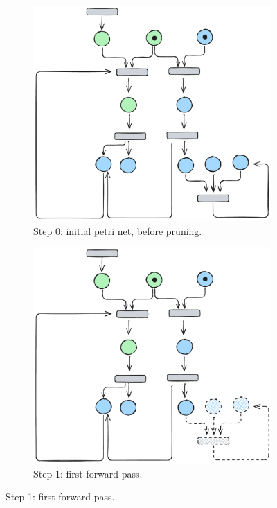 \begin{figure}[!htbp]
	\centering
	
	\begin{subfigure}[b]{0.45\textwidth}
		\centering
		\includegraphics[width=\textwidth]{plots/bidirectional_pruning_step_a_updated.pdf}
		\caption{Step 0: initial petri net, before pruning.}
		\label{fig:step:a}
	\end{subfigure}\hfill
	\begin{subfigure}[b]{0.45\textwidth}
		\centering
		\includegraphics[width=\textwidth]{plots/bidirectional_pruning_step_b_updated.pdf}
		\caption{Step 1: first forward pass.}
		\label{fig:step:b}
	\end{subfigure}
	

\end{figure}
